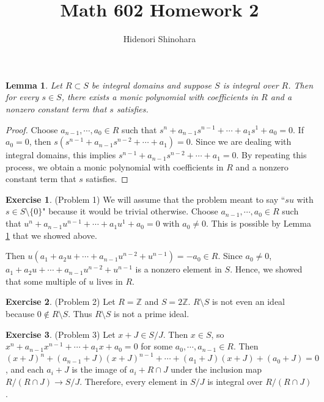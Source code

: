 \documentclass[12pt, psamsfonts]{amsart}
\newtheorem{lem}[thm]{Lemma}
\theoremstyle{definition}
\newtheorem*{exer}{Exercise}
\theoremstyle{remark}
\numberwithin{equation}{section}
\begin{document}
\title{Math 602 Homework 2}
\author{Hidenori Shinohara}
\maketitle

\begin{lem}\label{integral}
  Let $R \subset S$ be integral domains and suppose $S$ is integral over $R$.
  Then for every $s \in S$, there exists a monic polynomial with coefficients in $R$ and a nonzero constant term that $s$ satisfies.
\end{lem}

\begin{proof}
  Choose $a_{n - 1}, \cdots, a_0 \in R$ such that $s^n + a_{n - 1}s^{n - 1} + \cdots + a_1s^1 + a_0 = 0$.
  If $a_0 = 0$, then $s(s^{n - 1} + a_{n - 1}s^{n - 2} + \cdots + a_1) = 0$.
  Since we are dealing with integral domains, this implies $s^{n - 1} + a_{n - 1}s^{n - 2} + \cdots + a_1 = 0$.
  By repeating this process, we obtain a monic polynomial with coefficients in $R$ and a nonzero constant term that $s$ satisfies.
\end{proof}

\begin{exer}{(Problem 1)}
  We will assume that the problem meant to say ``$su$ with $s \in S \setminus \{ 0 \}$" because it would be trivial otherwise.
  Choose $a_{n - 1}, \cdots, a_0 \in R$ such that $u^n + a_{n - 1}u^{n - 1} + \cdots + a_1u^1 + a_0 = 0$ with $a_0 \ne 0$.
  This is possible by Lemma \ref{integral} that we showed above.

  Then $u(a_1 + a_2u + \cdots + a_{n - 1}u^{n - 2} + u^{n - 1}) = -a_0 \in R$.
  Since $a_0 \ne 0$, $a_1 + a_2u + \cdots + a_{n - 1}u^{n - 2} + u^{n - 1}$ is a nonzero element in $S$.
  Hence, we showed that some multiple of $u$ lives in $R$.
\end{exer}

\begin{exer}{(Problem 2)}
  Let $R = \mathbb{Z}$ and $S = 2\mathbb{Z}$.
  $R \setminus S$ is not even an ideal because $0 \notin R \setminus S$.
  Thus $R \setminus S$ is not a prime ideal.
\end{exer}

\begin{exer}{(Problem 3)}
  Let $x + J \in S / J$.
  Then $x \in S$, so $x^n + a_{n - 1}x^{n - 1} + \cdots + a_1x + a_0 = 0$ for some $a_0, \cdots, a_{n - 1} \in R$.
  Then $(x + J)^n + (a_{n - 1} + J)(x + J)^{n - 1} + \cdots + (a_1 + J)(x + J) + (a_0 + J) = 0$, and each $a_i + J$ is the image of $a_i + R \cap J$ under the inclusion map $R / (R \cap J) \rightarrow S / J$.
  Therefore, every element in $S / J$ is integral over $R / (R \cap J)$.
\end{exer}
\end{document}
